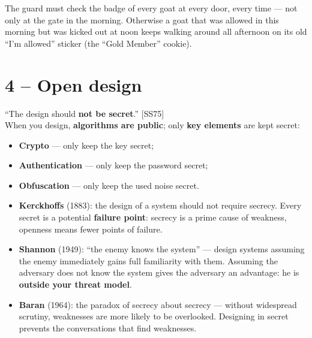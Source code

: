 \begin{goatbox}
The guard must check the badge of every goat at every door, every time --- not only at the
gate in the morning. Otherwise a goat that was allowed in this morning but was kicked out at noon
keeps walking around all afternoon on its old ``I'm allowed'' sticker (the ``Gold Member''
cookie).
\end{goatbox}

\section{4 -- Open design}

\begin{defnbox}[title=Open design]
``The design should \textbf{not be secret}.'' [SS75] \\
When you design, \textbf{algorithms are public}; only \textbf{key elements} are kept
secret:
\begin{itemize}
  \item \textbf{Crypto} --- only keep the key secret;
  \item \textbf{Authentication} --- only keep the password secret;
  \item \textbf{Obfuscation} --- only keep the used noise secret.
\end{itemize}
\end{defnbox}

\begin{rembox}[title=Historical formulations]
\begin{itemize}
  \item \textbf{Kerckhoffs} (1883): the design of a system should not require secrecy.
        Every secret is a potential \textbf{failure point}: secrecy is a prime cause of weakness,
        openness means fewer points of failure.
  \item \textbf{Shannon} (1949): ``the enemy knows the system'' --- design systems
        assuming the enemy immediately gains full familiarity with them. Assuming the adversary
        does not know the system gives the adversary an advantage: he is \textbf{outside your
        threat model}.
  \item \textbf{Baran} (1964): the paradox of secrecy about secrecy --- without
        widespread scrutiny, weaknesses are more likely to be overlooked. Designing in secret
        prevents the conversations that find weaknesses.
\end{itemize}
\end{rembox}

